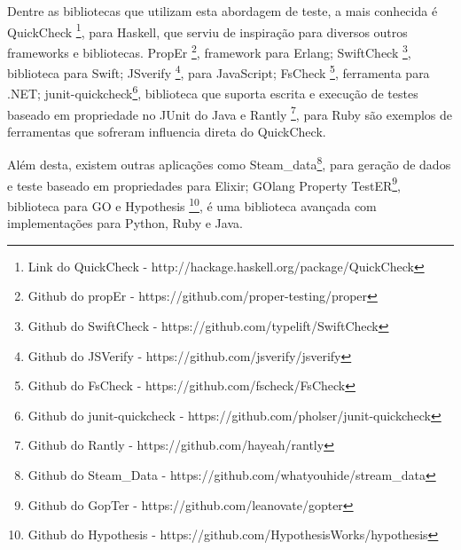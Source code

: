 	 Dentre as bibliotecas que utilizam esta abordagem de teste, a mais conhecida é QuickCheck \footnote{Link do QuickCheck - http://hackage.haskell.org/package/QuickCheck}, para Haskell, que serviu de inspiração para diversos outros frameworks e bibliotecas. PropEr \footnote{Github do propEr - https://github.com/proper-testing/proper}, framework para Erlang; SwiftCheck \footnote{Github do SwiftCheck - https://github.com/typelift/SwiftCheck}, biblioteca para Swift; JSverify \footnote{Github do JSVerify - https://github.com/jsverify/jsverify}, para JavaScript; FsCheck \footnote{Github do FsCheck - https://github.com/fscheck/FsCheck}, ferramenta para .NET; junit-quickcheck\footnote{Github do junit-quickcheck - https://github.com/pholser/junit-quickcheck}, biblioteca que suporta escrita e execução de testes baseado em propriedade no JUnit do Java e Rantly \footnote{Github do Rantly - https://github.com/hayeah/rantly}, para Ruby são exemplos de ferramentas que sofreram influencia direta do QuickCheck.
	 
	 Além desta, existem outras aplicações como Steam\_data\footnote{Github do Steam\_Data - https://github.com/whatyouhide/stream\_data}, para geração de dados e teste baseado em propriedades para Elixir; GOlang Property TestER\footnote{Github do GopTer - https://github.com/leanovate/gopter}, biblioteca para GO e Hypothesis \footnote{Github do Hypothesis - https://github.com/HypothesisWorks/hypothesis}, é uma biblioteca avançada com implementações para Python, Ruby e Java.